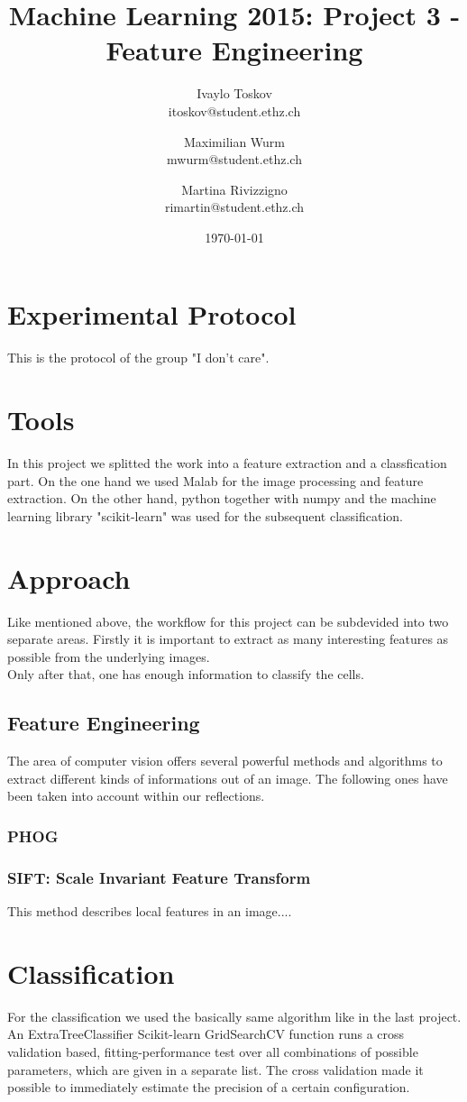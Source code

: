 \documentclass[a4paper, 11pt]{article}
\title{Machine Learning 2015: Project 3 - Feature Engineering}
\author{Ivaylo Toskov \\ itoskov@student.ethz.ch \and Maximilian Wurm \\ mwurm@student.ethz.ch \and 
	Martina Rivizzigno \\ rimartin@student.ethz.ch\\}
\date{\today}
\begin{document}
	\maketitle
	
	\section*{Experimental Protocol}
	This is the protocol of the group "I don't care".
	
	\section{Tools}
	In this project we splitted the work into a feature extraction and a classfication part.
	On the one hand we used Malab	for the image processing and feature extraction. 
	On the other hand, python together with numpy and the machine learning library "scikit-learn" was used for the subsequent classification.

	
	\section{Approach}
	Like mentioned above, the workflow for this project can be subdevided into two separate areas. 
	Firstly it is important to extract as many interesting features as possible from the underlying images. \\
	Only after that, one has enough information to classify the cells.

	
	\subsection{Feature Engineering}
	The area of computer vision offers several powerful methods and algorithms to extract different kinds of informations out of an image. The following ones have been taken into account within our reflections.

	\subsubsection{PHOG}
	\subsubsection{SIFT: Scale Invariant Feature Transform}
	This method describes local features in an image....

	\section{Classification}
	For the classification we used the basically same algorithm like in the last project. An ExtraTreeClassifier 
	Scikit-learn GridSearchCV function runs a cross validation based, fitting-performance test over all combinations of possible parameters, which are given in a separate list. The cross validation made it possible to immediately estimate the precision of a certain configuration. 
	
\end{document}
